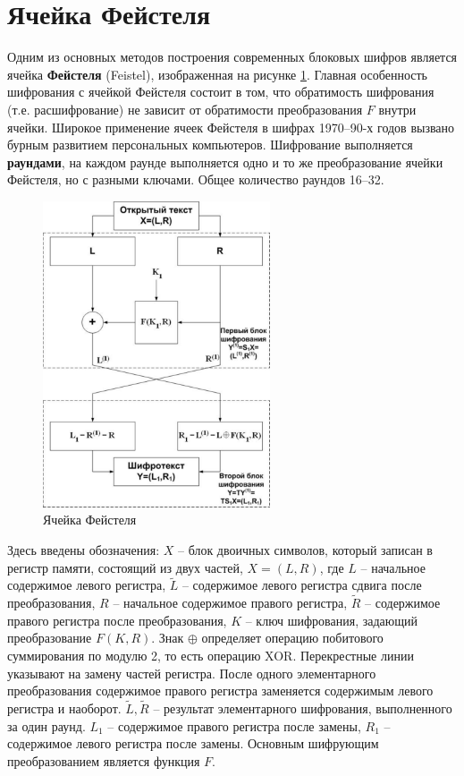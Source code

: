 \section{Ячейка Фейстеля}

Одним из основных методов построения современных блоковых шифров является ячейка \textbf{Фейстеля} (Feistel), изображенная на рисунке \ref{fig:Feistel}. Главная особенность шифрования с ячейкой Фейстеля состоит в том, что обратимость шифрования (т.е. расшифрование) не зависит от обратимости преобразования $F$ внутри ячейки. Широкое применение ячеек Фейстеля в шифрах 1970--90-х годов вызвано бурным развитием персональных компьютеров. Шифрование выполняется \textbf{раундами}, на каждом раунде выполняется одно и то же преобразование ячейки Фейстеля, но с разными ключами. Общее количество раундов 16--32.

\begin{figure}[!ht]
    \centering
    \includegraphics[width=0.6\textwidth]{pic/feistel}
    \caption{Ячейка Фейстеля\label{fig:Feistel}}
\end{figure}

Здесь введены обозначения: $X$ -- блок двоичных символов, который записан в регистр памяти, состоящий из двух частей, $X = (L,R)$, где $L$ -- начальное содержимое левого регистра, $\tilde{L}$ -- содержимое левого регистра сдвига после преобразования, $R$ -- начальное содержимое правого регистра, $\tilde{R}$ -- содержимое правого регистра после преобразования, $K$ -- ключ шифрования, задающий преобразование $F(K,R)$. Знак $\oplus$ определяет операцию побитового суммирования по модулю 2, то есть операцию XOR. Перекрестные линии указывают на замену частей регистра. После одного элементарного преобразования содержимое правого регистра заменяется содержимым левого регистра и наоборот. $\tilde{L},\tilde{R}$ -- результат элементарного шифрования, выполненного за один раунд. $L_{1}$ -- содержимое правого регистра после замены, $R_{1}$ -- содержимое левого регистра после замены. Основным шифрующим преобразованием является функция $F$.

